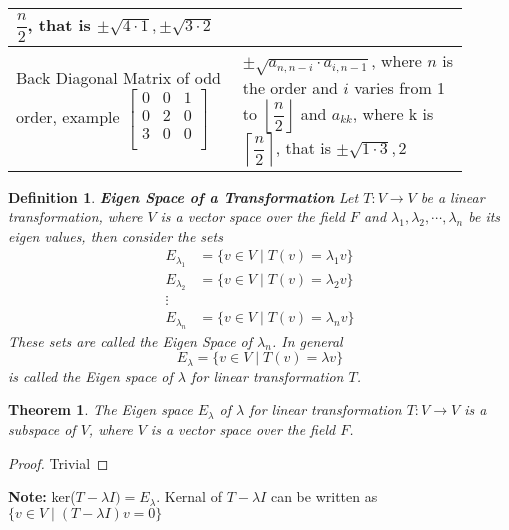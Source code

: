 \documentclass[a4paper, titlepage]{article}
\newtheorem{theorem}{Theorem}[section]
\newtheorem{definition}{Definition}[section]
\newcommand{\floor}[1]
{
    \left\lfloor #1 \right\rfloor
}
\newcommand{\ceil}[1]
{
    \left\lceil #1 \right\rceil
}
\begin{document}
\begin{center}
\begin{tabular}{ |p{0.45\linewidth}|p{0.45\linewidth}| }
                        $\dfrac{n}{2}$, that is $\pm\sqrt{4\cdot 1}, 
                        \pm\sqrt{3\cdot 2}$ \\
                    \hline
                    Back Diagonal Matrix of odd order, example
                        $\begin{bmatrix*}
                            0 & 0 & 1 \\
                            0 & 2 & 0 \\
                            3 & 0 & 0 \\
                        \end{bmatrix*}$
                    & %
                        $\pm\sqrt{a_{n, n-i}\cdot a_{i, n-1}}$, where 
                        $n$ is the order and $i$ varies from 1 to
                        $\floor{\dfrac{n}{2}}$ and $a_{kk}$, where k
                        is $\ceil{\dfrac{n}{2}}$, that is $\pm\sqrt{1\cdot 3}, 
                        2$ \\
                    \hline
                \end{tabular}
            \end{center}
        \begin{definition} \textup{\textbf{Eigen Space of a Transformation}}
            Let $T: V \to V$ be a linear transformation, where $V$ is a vector
            space over the field $F$ and $\lambda_1, \lambda_2, \cdots,
            \lambda_n$ be its eigen values, then consider the sets
            \begin{align*}
                E_{\lambda_1} &= \{v \in V \; | \; T(v) = \lambda_1 v \} \\            
                E_{\lambda_2} &= \{v \in V \; | \; T(v) = \lambda_2 v \} \\
                \vdots \\
                E_{\lambda_n} &= \{v \in V \; | \; T(v) = \lambda_n v \}
            \end{align*}
            These sets are called the Eigen Space of $\lambda_n$. In general 
            $$E_{\lambda} = \{v \in V \; | \; T(v) = \lambda v \}$$ is called
            the Eigen space of $\lambda$ for linear transformation $T$.
        \end{definition}

        \begin{theorem}
            The Eigen space $E_{\lambda}$ of $\lambda$ for linear
            transformation $T: V \to V$ is a subspace of $V$, where
            $V$ is a vector space over the field $F$.
        \end{theorem}
        \begin{proof}
            Trivial
        \end{proof}
        \noindent\textbf{Note: }ker($T - \lambda I) = E_{\lambda}$.
        Kernal of $T - \lambda I$ can be written as $\{ v \in V \; |
        \; (T-\lambda I)v = 0 \}$
\end{document}
